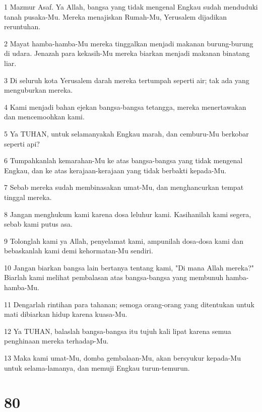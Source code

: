 \par 1 Mazmur Asaf. Ya Allah, bangsa yang tidak mengenal Engkau sudah menduduki tanah pusaka-Mu. Mereka menajiskan Rumah-Mu, Yerusalem dijadikan reruntuhan.
\par 2 Mayat hamba-hamba-Mu mereka tinggalkan menjadi makanan burung-burung di udara. Jenazah para kekasih-Mu mereka biarkan menjadi makanan binatang liar.
\par 3 Di seluruh kota Yerusalem darah mereka tertumpah seperti air; tak ada yang menguburkan mereka.
\par 4 Kami menjadi bahan ejekan bangsa-bangsa tetangga, mereka menertawakan dan mencemoohkan kami.
\par 5 Ya TUHAN, untuk selamanyakah Engkau marah, dan cemburu-Mu berkobar seperti api?
\par 6 Tumpahkanlah kemarahan-Mu ke atas bangsa-bangsa yang tidak mengenal Engkau, dan ke atas kerajaan-kerajaan yang tidak berbakti kepada-Mu.
\par 7 Sebab mereka sudah membinasakan umat-Mu, dan menghancurkan tempat tinggal mereka.
\par 8 Jangan menghukum kami karena dosa leluhur kami. Kasihanilah kami segera, sebab kami putus asa.
\par 9 Tolonglah kami ya Allah, penyelamat kami, ampunilah dosa-dosa kami dan bebaskanlah kami demi kehormatan-Mu sendiri.
\par 10 Jangan biarkan bangsa lain bertanya tentang kami, "Di mana Allah mereka?" Biarlah kami melihat pembalasan atas bangsa-bangsa yang membunuh hamba-hamba-Mu.
\par 11 Dengarlah rintihan para tahanan; semoga orang-orang yang ditentukan untuk mati dibiarkan hidup karena kuasa-Mu.
\par 12 Ya TUHAN, balaslah bangsa-bangsa itu tujuh kali lipat karena semua penghinaan mereka terhadap-Mu.
\par 13 Maka kami umat-Mu, domba gembalaan-Mu, akan bersyukur kepada-Mu untuk selama-lamanya, dan memuji Engkau turun-temurun.

\chapter{80}

